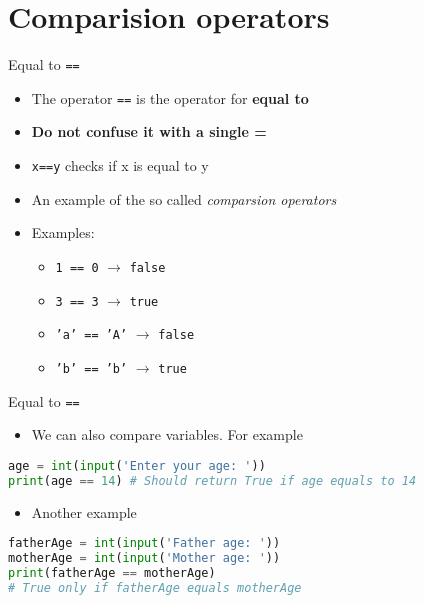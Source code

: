 \documentclass[10pt,xcolor={table,dvipsnames},t]{beamer}
\begin{document}
\section{Comparision operators}

\begin{frame}{Equal to \texttt{==}}
  \begin{itemize}
    \item The operator \texttt{==} is the operator for \textbf{equal to}
    \item \textbf{Do not confuse it with a single =}
    \item \texttt{x==y} checks if x is equal to y
    \item An example of the so called \textit{comparsion operators}
    \item Examples:
    \begin{itemize}
      \item \texttt{1 == 0} $\rightarrow$ \texttt{false}
      \item \texttt{3 == 3} $\rightarrow$ \texttt{true}
      \item \texttt{'a' == 'A'} $\rightarrow$ \texttt{false}
      \item \texttt{'b' == 'b'} $\rightarrow$ \texttt{true}
    \end{itemize}
  \end{itemize}
\end{frame}
\begin{frame}[fragile]{Equal to \texttt{==}}
  \begin{itemize}
    \item We can also compare variables. For example
  \end{itemize}
\begin{lstlisting}[language=python]
age = int(input('Enter your age: '))
print(age == 14) # Should return True if age equals to 14
\end{lstlisting}
\begin{itemize}
  \item Another example
\end{itemize}
\begin{lstlisting}[language=python]
fatherAge = int(input('Father age: '))
motherAge = int(input('Mother age: '))
print(fatherAge == motherAge) 
# True only if fatherAge equals motherAge
\end{lstlisting}
\end{frame}
\end{document}
